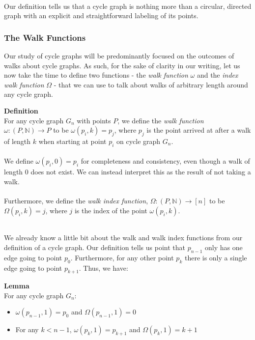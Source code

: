\documentclass[a4paper,12pt]{article}
\begin{document}
\noindent
\\
Our definition tells us that a cycle graph is nothing more than a circular, directed graph with an explicit and straightforward labeling of its points.


\subsubsection{The Walk Functions}

Our study of cycle graphs will be predominantly focused on the outcomes of walks about cycle graphs. As such, for the sake of clarity in our writing, let us now take the time to define two functions - the \textit{walk function} $\omega$ and the \textit{index walk function} $\Omega$ - that we can use to talk about walks of arbitrary length around any cycle graph.\\

\label{definition:walk_functions}
\hypertarget{definition:walk_functions}{}
\begin{tcolorbox}
\textbf{Definition}\\
For any cycle graph $G_n$ with points $P$, we define the \textit{walk function} $\omega: (P, \mathbb{N}) \rightarrow P$ to be $\omega(p_i, k) = p_j$, where $p_j$ is the point arrived at after a walk of length $k$ when starting at point $p_i$ on cycle graph $G_n$.\\
\\
We define $\omega(p_i, 0) = p_i$ for completeness and consistency, even though a walk of length $0$ does not exist. We can instead interpret this as the result of not taking a walk.\\
\\
Furthermore, we define the \textit{walk index function}, $\Omega: (P, \mathbb{N}) \rightarrow [n]$ to be $\Omega(p_i, k) = j$, where $j$ is the index of the point $\omega(p_i, k)$.
\end{tcolorbox}


\noindent
\\
We already know a little bit about the walk and walk index functions from our definition of a cycle graph. Our definition tells us point that $p_{n-1}$ only has one edge going to point $p_0$. Furthermore, for any other point $p_k$ there is only a single edge going to point $p_{k+1}$. Thus, we have:\\


\label{lemma:walk_1}
\hypertarget{lemma:walk_1}{}
\begin{tcolorbox}
\textbf{Lemma}\\
For any cycle graph $G_n$:
\begin{itemize}
\item $\omega(p_{n-1}, 1) = p_0$ and $\Omega(p_{n-1}, 1) = 0$
\item For any $k < n - 1$, $\omega(p_k, 1) = p_{k+1}$ and $\Omega(p_k, 1) = k + 1$
\end{itemize}
\end{tcolorbox}
\end{document}
